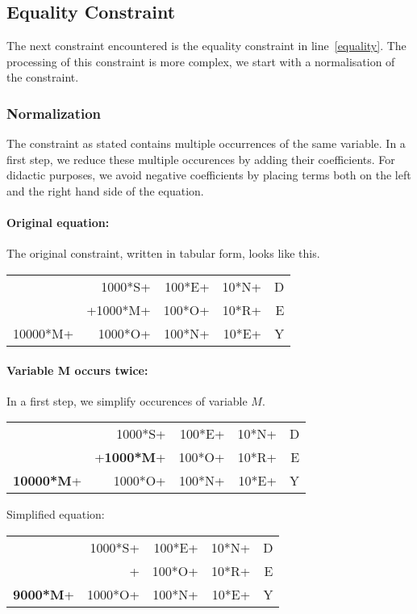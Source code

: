 \documentclass[a4paper]{article}
\begin{document}
\subsection{Equality Constraint}
The next constraint encountered is the equality constraint in line~\ref{equality}. The processing of this constraint is more complex, we start with a normalisation of the constraint.

\subsubsection{Normalization}

The constraint as stated contains multiple occurrences of the same variable. In a first step, we reduce these multiple occurences by adding their coefficients. For didactic purposes, we avoid negative coefficients by placing terms both on the left and the right hand side of the equation.

\paragraph{Original equation:}
The original constraint, written in tabular form, looks like this.

\begin{tabular}{rrrrr}
& 1000*S+ & 100*E+ & 10*N+ & D \\
& +1000*M+ & 100*O+ & 10*R+ & E \\ \hline
10000*M+ & 1000*O+ & 100*N+ & 10*E+ & Y
\end{tabular}

\paragraph{Variable M occurs twice:} In a first step, we simplify occurences of variable $M$.

\begin{tabular}{rrrrr}
& 1000*S+ & 100*E+ & 10*N+ & D \\
& +{\bf 1000*M}+ & 100*O+ & 10*R+ & E \\ \hline
{\bf 10000*M}+ & 1000*O+ & 100*N+ & 10*E+ & Y
\end{tabular}

Simplified equation:

\begin{tabular}{rrrrr}
& 1000*S+ & 100*E+ & 10*N+ & D \\
& + & 100*O+ & 10*R+ & E \\ \hline
{\bf 9000*M}+ & 1000*O+ & 100*N+ & 10*E+ & Y
\end{tabular}
\end{document}

